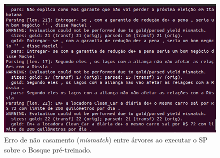 \begin{figure}[!h]
    \centering
    \includegraphics[width=.8\textwidth,scale=1.5]{imagens/erro_mismatch.png}
    \caption[Erro de não casamento (\textit{mismatch}) entre árvores]{Erro de não casamento (\textit{mismatch}) entre árvores ao executar o SP sobre o Bosque pré-treinado.}
    \label{fig:bosque_erro_mismatch}
\end{figure}